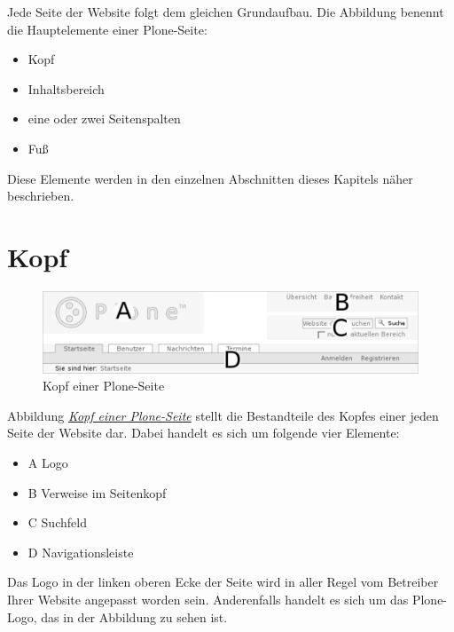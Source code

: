 \documentclass[a4paper,12pt,ngerman]{manual}
\begin{document}
Jede Seite der Website folgt dem gleichen Grundaufbau. Die Abbildung
benennt die Hauptelemente einer Plone-Seite:
\begin{itemize}
\item {} 
Kopf

\item {} 
Inhaltsbereich

\item {} 
eine oder zwei Seitenspalten

\item {} 
Fuß

\end{itemize}

Diese Elemente werden in den einzelnen Abschnitten dieses Kapitels näher
beschrieben.


\section{Kopf}
\hypertarget{fig-ploneheader}{}\begin{figure}[htbp]
\centering

\includegraphics[width=1.000\linewidth]{ploneheader.png}
\caption{Kopf einer Plone-Seite}\end{figure}

Abbildung \hyperlink{fig-ploneheader}{\emph{Kopf einer Plone-Seite}} stellt die Bestandteile des Kopfes einer
jeden Seite der Website dar. Dabei handelt es sich um folgende vier Elemente:
\begin{itemize}
\item {} 
A Logo

\item {} 
B Verweise im Seitenkopf

\item {} 
C Suchfeld

\item {} 
D Navigationsleiste

\end{itemize}

Das Logo in der linken oberen Ecke der Seite wird in aller Regel vom
Betreiber Ihrer Website angepasst worden sein. Anderenfalls handelt es
sich um das Plone-Logo, das in der Abbildung zu sehen ist.
\end{document}
